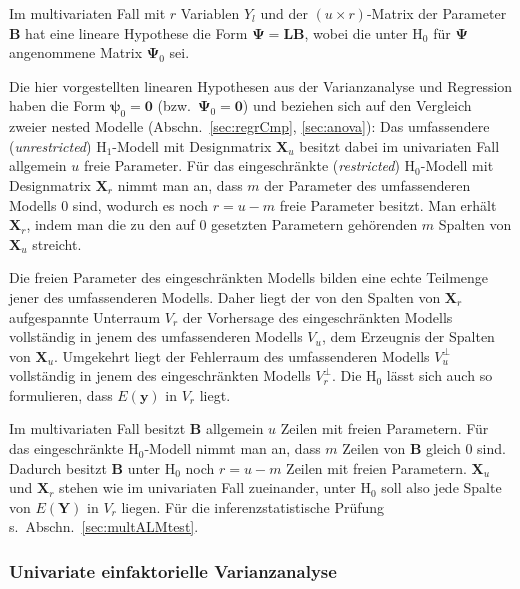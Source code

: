 Im multivariaten Fall mit $r$ Variablen $Y_{l}$ und der $(u \times r)$-Matrix der Parameter $\bm{B}$ hat eine lineare Hypothese die Form $\bm{\Psi} = \bm{L} \bm{B}$, wobei die unter $\text{H}_{0}$ für $\bm{\Psi}$ angenommene Matrix $\bm{\Psi}_{0}$ sei.

Die hier vorgestellten linearen Hypothesen aus der Varianzanalyse und Regression haben die Form $\bm{\psi}_{0} = \bm{0}$ (bzw.\ $\bm{\Psi}_{0} = \bm{0}$) und beziehen sich auf den Vergleich zweier nested Modelle (Abschn.\ \ref{sec:regrCmp}, \ref{sec:anova}): Das umfassendere (\emph{unrestricted}) $\text{H}_{1}$-Modell mit Designmatrix $\bm{X}_{u}$ besitzt dabei im univariaten Fall allgemein $u$ freie Parameter. Für das eingeschränkte (\emph{restricted}) $\text{H}_{0}$-Modell mit Designmatrix $\bm{X}_{r}$ nimmt man an, dass $m$ der Parameter des umfassenderen Modells $0$ sind, wodurch es noch $r = u-m$ freie Parameter besitzt. Man erhält $\bm{X}_{r}$, indem man die zu den auf $0$ gesetzten Parametern gehörenden $m$ Spalten von $\bm{X}_{u}$ streicht.

Die freien Parameter des eingeschränkten Modells bilden eine echte Teilmenge jener des umfassenderen Modells. Daher liegt der von den Spalten von $\bm{X}_{r}$ aufgespannte Unterraum $V_{r}$ der Vorhersage des eingeschränkten Modells vollständig in jenem des umfassenderen Modells $V_{u}$, dem Erzeugnis der Spalten von $\bm{X}_{u}$. Umgekehrt liegt der Fehlerraum des umfassenderen Modells $V_{u}^{\perp}$ vollständig in jenem des eingeschränkten Modells $V_{r}^{\perp}$. Die $\text{H}_{0}$ lässt sich auch so formulieren, dass $E(\bm{y})$ in $V_{r}$ liegt.

Im multivariaten Fall besitzt $\bm{B}$ allgemein $u$ Zeilen mit freien Parametern. Für das eingeschränkte $\text{H}_{0}$-Modell nimmt man an, dass $m$ Zeilen von $\bm{B}$ gleich $0$ sind. Dadurch besitzt $\bm{B}$ unter $\text{H}_{0}$ noch $r = u-m$ Zeilen mit freien Parametern. $\bm{X}_{u}$ und $\bm{X}_{r}$ stehen wie im univariaten Fall zueinander, unter $\text{H}_{0}$ soll also jede Spalte von $E(\bm{Y})$ in $V_{r}$ liegen. Für die inferenzstatistische Prüfung s.\ Abschn.\ \ref{sec:multALMtest}.

\subsubsection{Univariate einfaktorielle Varianzanalyse}

